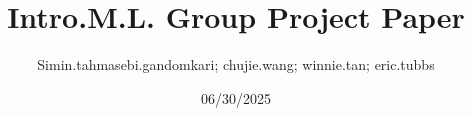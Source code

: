 \title{Intro.M.L. Group Project Paper}
\author{Simin.tahmasebi.gandomkari; chujie.wang; winnie.tan; eric.tubbs}
\date{06/30/2025}
%
